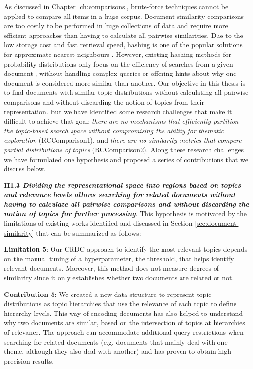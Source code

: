 As discussed in Chapter \ref{ch:comparisons}, brute-force techniques cannot be applied to compare all items in a huge corpus. Document similarity comparisons are too costly to be performed in huge collections of data and require more efficient approaches than having to calculate all pairwise similarities. Due to the low storage cost and fast retrieval speed, hashing is one of the popular solutions for approximate nearest neighbours \citep{Zhen2016}. However, existing hashing methods for probability distributions only focus on the efficiency of searches from a given document \citep{Mao2017}, without handling complex queries or offering hints about why one document is considered more similar than another. Our objective in this thesis is to find documents with similar topic distributions without calculating all pairwise comparisons and without discarding the notion of topics from their representation. But we have identified some research challenges that make it difficult to achieve that goal: \textit{there are no mechanisms that efficiently partition the topic-based search space without compromising the ability for thematic exploration} (RCComparison1), and \textit{there are no similarity metrics that compare partial distributions of topics} (RCComparison2). Along these research challenges we have formulated one hypothesis and proposed a series of contributions that we discuss below.

\textbf{H1.3 \textit{Dividing the representational space into regions based on topics and relevance levels allows searching for related documents without having to calculate all pairwise comparisons and without discarding the notion of topics for further processing}}. This hypothesis is motivated by the limitations of existing works identified and discussed in Section \ref{sec:document-similarity} that can be summarized as follows:


\textbf{Limitation 5}: Our CRDC approach to identify the most relevant topics depends on the manual tuning of a hyperparameter, the threshold, that helps identify relevant documents. Moreover, this method does not measure degrees of similarity since it only establishes whether two documents are related or not. 

\textbf{Contribution 5}: We created a new data structure to represent topic distributions as topic hierarchies that use the relevance of each topic to define hierarchy levels. This way of encoding documents has also helped to understand why two documents are similar, based on the intersection of topics at hierarchies of relevance. The approach can accommodate additional query restrictions when searching for related documents (e.g. documents that mainly deal with one theme, although they also deal with another) and has proven to obtain high-precision results. 

